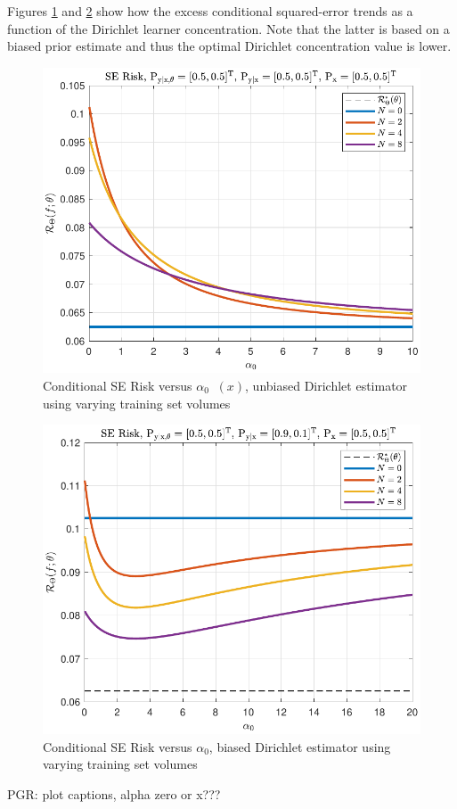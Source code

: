 \documentclass[12pt]{report}
\DeclareMathOperator{\alpham}{\alpha_\text{m}}
\begin{document}
Figures \ref{fig:Risk_cond_SE_Dir_a0_leg_N_unbiased} and \ref{fig:Risk_cond_SE_Dir_a0_leg_N_biased} show how the excess conditional squared-error trends as a function of the Dirichlet learner concentration. Note that the latter is based on a biased prior estimate and thus the optimal Dirichlet concentration value is lower.
\begin{figure}
\centering
\includegraphics[width=0.7\linewidth]{Risk_cond_SE_Dir_a0_leg_N_unbiased.pdf}
\caption{Conditional SE Risk versus $\alpha_0 \alpham(x)$, unbiased Dirichlet estimator using varying training set volumes}
\label{fig:Risk_cond_SE_Dir_a0_leg_N_unbiased}
\end{figure}
\begin{figure}
\centering
\includegraphics[width=0.7\linewidth]{Risk_cond_SE_Dir_a0_leg_N_biased.pdf}
\caption{Conditional SE Risk versus $\alpha_0$, biased Dirichlet estimator using varying training set volumes}
\label{fig:Risk_cond_SE_Dir_a0_leg_N_biased}
\end{figure}

PGR: plot captions, alpha zero or x???
\end{document}
